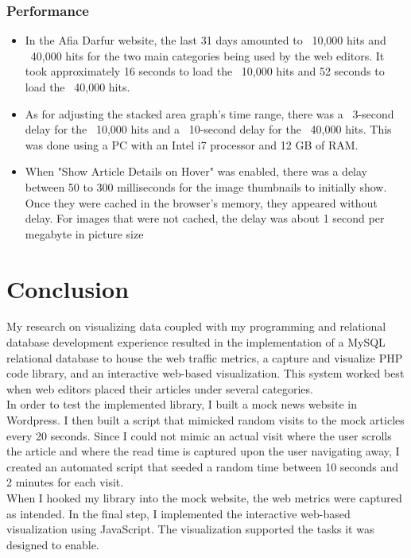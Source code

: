 \documentclass[12pt]{article}
\begin{document}
\subsubsection{Performance}
\begin{itemize}
\item In the Afia Darfur website, the last 31 days amounted to ~10,000 hits and ~40,000 hits for the two main categories being used by the web editors. It took approximately 16 seconds to load the ~10,000 hits and 52 seconds to load the ~40,000 hits. 
\item As for adjusting the stacked area graph's time range, there was a ~3-second delay for the ~10,000 hits and a ~10-second delay for the ~40,000 hits. This was done using a PC with an Intel i7 processor and 12 GB of RAM. 
\item When "Show Article Details on Hover" was enabled, there was a delay between 50 to 300 milliseconds for the image thumbnails to initially show. Once they were cached in the browser's memory, they appeared without delay. For images that were not cached, the delay was about 1 second per megabyte in picture size
\end{itemize}

\newpage

\section{Conclusion}
My research on visualizing data coupled with my programming and relational database development experience resulted in the implementation of a  MySQL relational database to house the web traffic metrics, a capture and visualize PHP code library, and an interactive web-based visualization. This system worked best when web editors placed their articles under several categories.  \\ 

In order to test the implemented library, I built a mock news website in Wordpress. I then built a script that mimicked random visits to the mock articles every 20 seconds. Since I could not mimic an actual visit where the user scrolls the article and where the read time is captured upon the user navigating away, I created an automated script that seeded a random time between 10 seconds and 2 minutes for each visit. \\ When I hooked my library into the mock website, the web metrics were captured as intended. 
In the final step, I implemented the interactive web-based visualization using JavaScript. The visualization supported the tasks it was designed to enable. \\
\end{document}
